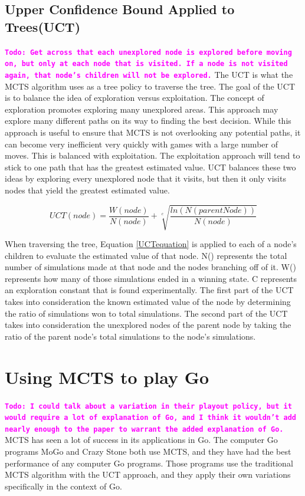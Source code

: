 \documentclass{sig-alternate}
\newcommand{\comment}[1]{{\bf \tt  {#1}}}
\newcommand{\todo}[1]{\textcolor{magenta}{\comment{Todo: {#1}}}}
\begin{document}
\subsection{Upper Confidence Bound Applied to Trees(UCT)}
\todo{Get across that each unexplored node is explored before moving on, but only at each node that is visited. If a node is not visited again, that node's children will not be explored.}
The UCT is what the MCTS algorithm uses as a tree policy to traverse the tree. The goal of the UCT is to balance the idea of exploration versus exploitation. The concept of exploration promotes exploring many unexplored areas. This approach may explore many different paths on its way to finding the best decision. While this approach is useful to ensure that MCTS is not overlooking any potential paths, it can become very inefficient very quickly with games with a large number of moves. This is balanced with exploitation. The exploitation approach will tend to stick to one path that has the greatest estimated value. UCT balances these two ideas by exploring every unexplored node that it visits, but then it only visits nodes that yield the greatest estimated value.

 \begin{equation}
 \label{UCTequation}
 UCT(node) = \frac{W(node)}{N(node)} + \sqrt[c]{\frac{ln(N(parentNode))}{N(node)}}
 \end{equation}

When traversing the tree, Equation \ref{UCTequation} is applied to each of a node's children to evaluate the estimated value of that node\cite{ActionSelection}. N() represents the total number of simulations made at that node and the nodes branching off of it. W() represents how many of those simulations ended in a winning state. C represents an exploration constant that is found experimentally. The first part of the UCT takes into consideration the known estimated value of the node by determining the ratio of simulations won to total simulations. The second part of the UCT takes into consideration the unexplored nodes of the parent node by taking the ratio of the parent node's total simulations to the node's simulations.

\section{Using MCTS to play Go}
\todo{I could talk about a variation in their playout policy, but it would require a lot of explanation of Go, and I think it wouldn't add nearly enough to the paper to warrant the added explanation of Go.}
MCTS has seen a lot of success in its applications in Go. The computer Go programs MoGo and Crazy Stone both use MCTS, and they have had the best performance of any computer Go programs\cite{RAVEinGo}. Those programs use the traditional MCTS algorithm with the UCT approach, and they apply their own variations specifically in the context of Go.
\end{document}
